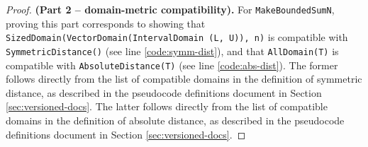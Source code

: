 \documentclass[11pt,a4paper]{article}
\theoremstyle{definition}
\newcommand{\din}{\texttt{d\_in}}
\newcommand{\dout}{\texttt{d\_out}}
\newcommand{\silvia}[1]{{ {\color{blue}{(silvia)~#1}}}}
\newcommand{\connor}[1]{{ {\color{teal}{(connor)~#1}}}}
\begin{document}
    \begin{proof}
    \textbf{(Part 2 -- domain-metric compatibility).} For \texttt{MakeBoundedSumN}, proving this part corresponds to showing that \texttt{SizedDomain(VectorDomain(IntervalDomain (L, U)), n)} is compatible with \texttt{SymmetricDistance()} (see line \ref{code:symm-dist}), and that \texttt{AllDomain(T)} is compatible with \texttt{AbsoluteDistance(T)} (see line \ref{code:abs-dist}).
    The former follows directly from the list of compatible domains in the definition of symmetric distance, as described in the pseudocode definitions document in Section \ref{sec:versioned-docs}. The latter follows directly from the list of compatible domains in the definition of absolute distance, as described in the pseudocode definitions document in Section \ref{sec:versioned-docs}. 
    \end{proof}
    
    
    
    
    
    


    
    
    
    
    
\end{document}

